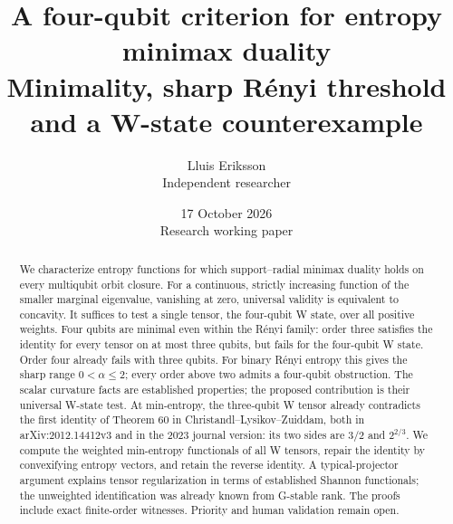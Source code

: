 \documentclass[11pt,a4paper]{article}
\title{A four-qubit criterion for entropy minimax duality\\
\large Minimality, sharp R\'enyi threshold and a W-state counterexample}
\author{Lluis Eriksson\\ \small Independent researcher}
\date{17 October 2026\\ \small Research working paper}
\begin{document}
\maketitle
\begin{abstract}
We characterize entropy functions for which support--radial minimax
duality holds on every multiqubit orbit closure. For a continuous,
strictly increasing function of the smaller marginal eigenvalue,
vanishing at zero, universal validity is equivalent to concavity.
It suffices to test a single tensor, the four-qubit W state, over all
positive weights. Four qubits are minimal even within the R\'enyi family:
order three satisfies the identity for every tensor on at most
three qubits, but fails for the four-qubit W state. Order four
already fails with three qubits. For binary R\'enyi entropy this gives the sharp
range \(0<\alpha\le2\); every order above two admits a four-qubit
obstruction. The scalar curvature facts are established properties;
the proposed contribution is their universal W-state test.
At min-entropy, the three-qubit W tensor already contradicts the first
identity of Theorem 60 in Christandl--Lysikov--Zuiddam,
both in arXiv:2012.14412v3 and in the 2023 journal version:
its two sides are \(3/2\) and \(2^{2/3}\).
We compute the weighted min-entropy functionals of all W tensors,
repair the identity by convexifying entropy vectors, and retain the
reverse identity. A typical-projector argument explains tensor
regularization in terms of established Shannon functionals; the
unweighted identification was already known from G-stable rank.
The proofs include exact finite-order witnesses. Priority and
human validation remain open.
\end{abstract}
\end{document}
